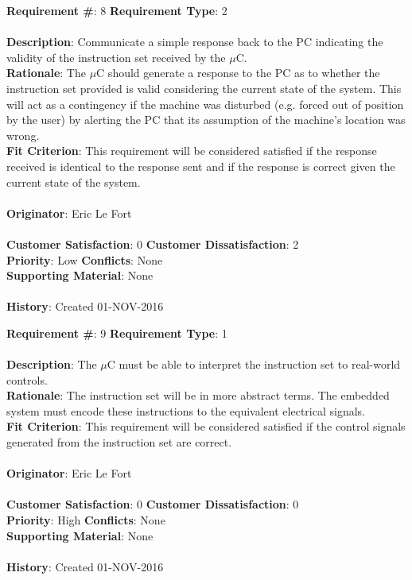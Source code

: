 \documentclass[titlepage]{article}
\begin{document}
\begin{framed}
	\noindent\textbf{Requirement \#}: 8 \hfill \textbf{Requirement Type}: 2 \hfill\\\\
	\noindent\textbf{Description}: Communicate a simple response back to the PC indicating the validity of the instruction set received by the $\mu$C.\\
	\textbf{Rationale}: The $\mu$C should generate a response to the PC as to whether the instruction set provided is valid considering the current state of the system. This will act as a contingency if the machine was disturbed (e.g. forced out of position by the user) by alerting the PC that its assumption of the machine's location was wrong.\\
	\textbf{Fit Criterion}: This requirement will be considered satisfied if the response received is identical to the response sent and if the response is correct given the current state of the system.\\\\
	\textbf{Originator}: Eric Le Fort\\\\
	\noindent\textbf{Customer Satisfaction}: 0 \hfill 	\textbf{Customer Dissatisfaction}: 2 \hfill\\
	\textbf{Priority}: Low \hfill \textbf{Conflicts}: None \hfill\\
	\textbf{Supporting Material}: None\\\\
	\noindent\textbf{History}: Created 01-NOV-2016
\end{framed}

\begin{framed}
	\noindent\textbf{Requirement \#}: 9 \hfill \textbf{Requirement Type}: 1 \hfill\\\\
	\noindent\textbf{Description}: The $\mu$C must be able to interpret the instruction set to real-world controls.\\
	\textbf{Rationale}: The instruction set will be in more abstract terms.  The embedded system must encode these instructions to the equivalent electrical signals.\\
	\textbf{Fit Criterion}: This requirement will be considered satisfied if the control signals generated from the instruction set are correct.\\\\
	\textbf{Originator}: Eric Le Fort\\\\
	\noindent\textbf{Customer Satisfaction}: 0 \hfill 	\textbf{Customer Dissatisfaction}: 0 \hfill\\
	\textbf{Priority}: High \hfill \textbf{Conflicts}: None \hfill\\
	\textbf{Supporting Material}: None\\\\
	\noindent\textbf{History}: Created 01-NOV-2016
\end{framed}
\end{document}
